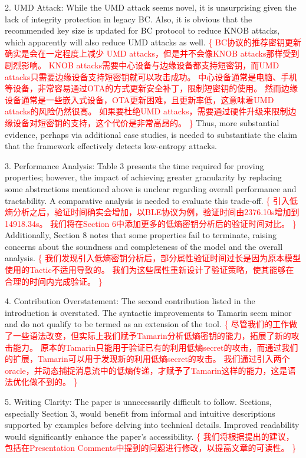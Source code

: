 \documentclass{article}
\newcommand{\response}[1]{\textcolor{red}{\{#1\}}}
\begin{document}
2. UMD Attack: 
While the UMD attack seems novel, it is unsurprising given the lack of integrity protection in legacy BC. 
Also, it is obvious that the recommended key size is updated for BC protocol to reduce KNOB attacks, which apparently will also reduce UMD attacks as well. 
\response{
    BC协议的推荐密钥更新确实是会在一定程度上减少 UMD attacks，但是并不会像KNOB attacks那样受到剧烈影响。
    KNOB attacks需要中心设备与边缘设备都支持短密钥，而UMD attacks只需要边缘设备支持短密钥就可以攻击成功。
    中心设备通常是电脑、手机等设备，非常容易通过OTA的方式更新安全补丁，限制短密钥的使用。
    然而边缘设备通常是一些嵌入式设备，OTA更新困难，且更新率低，这意味着UMD attacks的风险仍然很高。
    如果要杜绝UMD attacks，需要通过硬件升级来限制边缘设备对短密钥的支持，这个代价是非常高昂的。
}
Thus, more substantial evidence, perhaps via additional case studies, is needed to substantiate the claim that the framework effectively detects low-entropy attacks.


3. Performance Analysis: 
Table 3 presents the time required for proving properties; 
however, the impact of achieving greater granularity by replacing some abstractions mentioned above is unclear regarding overall performance and tractability. 
A comparative analysis is needed to evaluate this trade-off. 
\response{
    引入低熵分析之后，验证时间确实会增加，以BLE协议为例，验证时间由2376.10s增加到14918.34s。
    我们将在Section 6中添加更多的低熵密钥分析后的验证时间对比。
}
Additionally, Section 8 notes that some properties fail to terminate, raising concerns about the soundness and completeness of the model and the overall analysis.
\response{
    我们发现引入低熵密钥分析后，部分属性验证时间过长是因为原本模型使用的Tactic不适用导致的。
    我们为这些属性重新设计了验证策略，使其能够在合理的时间内完成验证。
}

4. Contribution Overstatement: 
The second contribution listed in the introduction is overstated. 
The syntactic improvements to Tamarin seem minor and do not qualify to be termed as an extension of the tool.
\response{
    尽管我们的工作做了一些语法改变，但实际上我们赋予Tamarin分析低熵密钥的能力，拓展了新的攻击能力。
    原本的Tamarin只能用于验证已有的利用低熵secret的攻击，而通过我们的扩展，Tamarin可以用于发现新的利用低熵secret的攻击。
    我们通过引入两个oracle，并动态捕捉消息流中的低熵传递，才赋予了Tamarin这样的能力，这是语法优化做不到的。
} 

5. Writing Clarity: 
The paper is unnecessarily difficult to follow. 
Sections, especially Section 3, would benefit from informal and intuitive descriptions supported by examples before delving into technical details. 
Improved readability would significantly enhance the paper’s accessibility.
\response{
    我们将根据提出的建议，包括在Presentation Comments中提到的问题进行修改，以提高文章的可读性。
}
\end{document}
